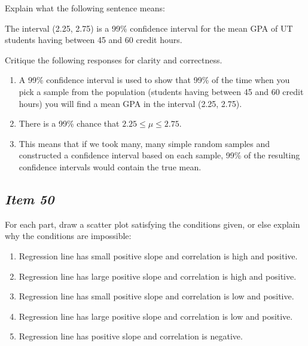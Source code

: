 Explain what the following sentence means:





The interval (2.25, 2.75) is a 99\% confidence interval for the mean GPA of UT students having between 45 and 60 credit hours.





Critique the following responses for clarity and correctness.





\begin{enumerate} [leftmargin=1cm, itemsep=.2em]


\item A 99\% confidence interval is used to show that 99\% of the time when you pick a sample from the population (students having between 45 and 60 credit hours) you will find a mean GPA in the interval (2.25, 2.75).





\item 


There is a 99\% chance that $2.25 \leq \mu \leq 2.75$.





\item This means that if we took many, many simple random samples and constructed a confidence interval based on each sample, 99\% of the resulting confidence intervals would contain the true mean.


\end{enumerate}





\subsection{\textbf{\textit{Item 50}}}


For each part, draw a scatter plot satisfying the conditions given, or else explain why the conditions are impossible:


\begin{enumerate} [leftmargin=1cm, itemsep=.2em]


\item Regression line has small positive slope and correlation is high and positive.


\item Regression line has large positive slope and correlation is high and positive.


\item Regression line has small positive slope and correlation is low and positive.


\item Regression line has large positive slope and correlation is low and positive.


\item Regression line has positive slope and correlation is negative.


\end{enumerate}





